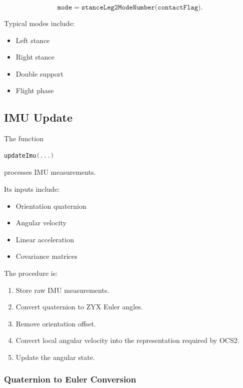\begin{equation}
\texttt{mode}
=
\texttt{stanceLeg2ModeNumber(contactFlag)}.
\end{equation}

Typical modes include:

\begin{itemize}
    \item Left stance
    \item Right stance
    \item Double support
    \item Flight phase
\end{itemize}

\subsection{IMU Update}

The function

\begin{lstlisting}[language=C++]
updateImu(...)
\end{lstlisting}

processes IMU measurements.

Its inputs include:

\begin{itemize}
    \item Orientation quaternion
    \item Angular velocity
    \item Linear acceleration
    \item Covariance matrices
\end{itemize}

The procedure is:

\begin{enumerate}
    \item Store raw IMU measurements.
    \item Convert quaternion to ZYX Euler angles.
    \item Remove orientation offset.
    \item Convert local angular velocity into the representation required by OCS2.
    \item Update the angular state.
\end{enumerate}

\subsubsection{Quaternion to Euler Conversion}

